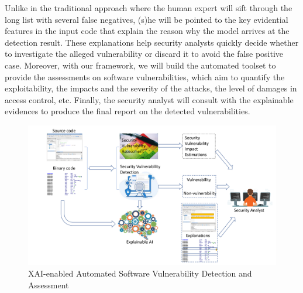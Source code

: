Unlike in the traditional approach where the human expert will sift
through the long list with several false negatives, (s)he will be
pointed to the key evidential features in the input code that explain
the reason why the model arrives at the detection result. These
explanations help security analysts quickly decide whether to
investigate the alleged vulnerability or discard it to avoid the false
positive case. Moreover, with our {\tool} framework, we will build the
automated toolset to provide the assessments on software
vulnerabilities, which aim to quantify the exploitability, the impacts
and the severity of the attacks, the level of damages in access
control, etc. 
Finally, the security analyst will consult with the explainable
evidences to produce the final report on the detected vulnerabilities.


\begin{figure}[t]
	\centering
	\includegraphics[width=5in]{figures/satc-illustration}
	\caption{XAI-enabled Automated Software Vulnerability Detection and Assessment}
	\label{fig:overview}
\end{figure}

